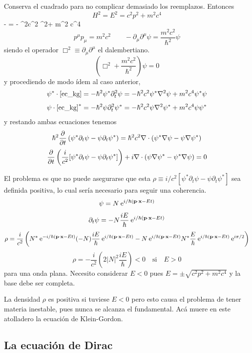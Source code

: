 \documentclass[10pt,oneside]{CBFT_book}
\begin{document}
Conserva el cuadrado para no complicar demasiado los reemplazos. Entonces 
\[
	H^2 = E^2 = c^2p^2 + m^2c^4
\]
\be \label{ec_kg}
	-\hbar {} = - \hbar^2c^2 \Nabla^2\psi + m^2 c^4 \psi
\ee
\[
	p^\mu p_\mu = m^2c^2 \qquad -\partial_\mu\partial^\mu \psi = \frac{m^2c^2}{\hbar^2}\psi
\]
siendo el operador $\Box^2 \equiv \partial_\mu\partial^\mu$ el dalembertiano.
\[
	\left( \Box^2 + \frac{m^2c^2}{\hbar^2} \right) \psi = 0
\]
y procediendo de modo ídem al caso anterior,
\[
	\psi^* \cdot \eqref{ec_kg} = - \hbar^2 \psi^* \partial_t^2 \psi =
	- \hbar^2 c^2 \psi^* \nabla^2 \psi + m^2 c^4 \psi^*\psi
\]
\[
	\psi \cdot \eqref{ec_kg}^* = - \hbar^2 \psi \partial_t^2 \psi^* =
	- \hbar^2 c^2 \psi \nabla^2 \psi^* + m^2 c^4 \psi\psi^*
\]
y restando ambas ecuaciones tenemos
\[
	\hbar^2 \frac{\partial^{\hspace{-0.05em}} {}}{\partial {t}^{\hspace{-0.05em}}}\left(  \psi^* \partial_t \psi -  \psi \partial_t \psi^* \right) =
	\hbar^2 c^2 \mathbf{\nabla}\cdot( \psi^* \mathbf{\nabla} \psi - \psi \mathbf{\nabla} \psi^* )
\]
\[
	\frac{\partial^{\hspace{-0.05em}} {}}{\partial {t}^{\hspace{-0.05em}}}\left( \frac{i}{c^2}[ \psi^* \partial_t \psi -  \psi \partial_t \psi^* ]\right) +
	i\mathbf{\nabla}\cdot( \psi \mathbf{\nabla} \psi^* - \psi^* \mathbf{\nabla} \psi ) = 0
\]

El problema es que no puede asegurarse que esta $\rho \equiv i/c^2[ \psi^* \partial_t \psi -  \psi \partial_t 
\psi^* ]$ sea definida positiva, lo cual sería necesario para seguir una coherencia.
\[
	\psi = N \euler^{ i/\hbar(\pe{p}{x} - Et)}
\]
\[
	\partial_t \psi = -N \frac{iE}{\hbar} \euler^{ i/\hbar(\pe{p}{x} - Et)}
\]
\[
	\rho = \frac{i}{c^2}\left( N^*\euler^{ -i/\hbar(\pe{p}{x} - Et)}(-N)
	\frac{iE}{\hbar} \euler^{ i/\hbar(\pe{p}{x} - Et)} - 
	N \euler^{ i/\hbar(\pe{p}{x} - Et)}N^*\frac{E}{\hbar} \euler^{ i/\hbar(\pe{p}{x} - Et)}\euler^{i\pi/2}
	\right)
\]
\[
	\rho = -\frac{i}{c^2}\left( 2|N|^2 \frac{iE}{\hbar} \right) < 0 \quad \text{si} \quad E > 0
\]
para una onda plana.
Necesito considerar $E<0$ pues $E=\pm\sqrt{c^2p^2+m^2c^4}$ y la base debe ser completa.

La densidad $\rho$ es positiva si tuviese $E<0$ pero esto causa el problema de tener materia inestable, pues nunca se 
alcanza el fundamental. Acá muere en este atolladero la ecuación de Klein-Gordon.

\subsection{La ecuación de Dirac}
\end{document}

